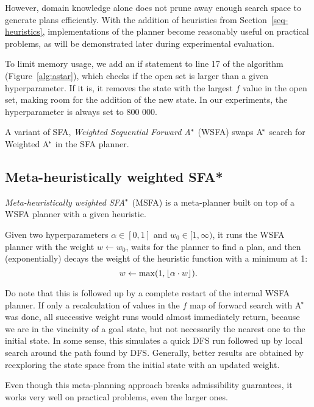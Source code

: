 However, domain knowledge alone does not
prune away enough search space to
generate plans efficiently.
With the addition of
heuristics
from Section~\ref{seq-heuristics},
implementations of the planner become reasonably useful
on practical problems, as will be demonstrated
later during experimental evaluation.

To limit memory usage, we add an if statement to line 17 of the algorithm
(Figure~\ref{alg:astar}),
which checks if the open set is larger than a given hyperparameter.
If it is, it removes the state with the largest $f$ value in the open set,
making room for the addition of the new state. In our experiments,
the hyperparameter is always set to 800 000.

A variant of SFA,
\textit{Weighted Sequential Forward A$^{\kern-.05em*}$} (WSFA)
swaps A$^{\kern-.15em*}$ search for Weighted A$^{\kern-.15em*}$ in the SFA planner.

\subsection{Meta-heuristically weighted SFA*}\label{msfa}

\textit{Meta-heuristically weighted SFA$^{\kern-.05em*}$} (MSFA) is
a meta-planner built on top of a WSFA planner with
a given heuristic.

Given two hyperparameters $\alpha \in [0, 1]$ and $w_0 \in [1, \infty)$,
it runs the WSFA planner with the weight $w \gets w_0$,
waits for the planner to find a plan,
and then (exponentially) decays the
weight of the heuristic function
with a minimum at 1: $$w \gets \max(1, \floor*{\alpha \cdot w}).$$

Do note that this is followed up by a complete restart of the internal WSFA planner.
If only a recalculation of values in the $f$ map
of forward search with A$^{\kern-.15em*}$ was done, all successive
weight runs would almost immediately return, because we are in the vincinity of a goal state,
but not necessarily the nearest one to the initial state.
In some sense, this simulates a quick DFS run followed up
by local search around the path found by DFS.
Generally, better results are obtained by reexploring the
state space from the initial state with an updated weight.

Even though this meta-planning approach breaks
admissibility guarantees, it works very well on
practical problems, even the larger ones.



















